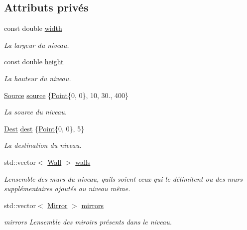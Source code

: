 \subsection*{Attributs privés}
\begin{DoxyCompactItemize}
\item 
const double \hyperlink{classLevel_ae8e8f0fd1ed923ab9faf37bebb961cdf}{width}
\begin{DoxyCompactList}\small\item\em La largeur du niveau. \end{DoxyCompactList}\item 
const double \hyperlink{classLevel_a65034a4fcaebb97c0a640600d1681ae9}{height}
\begin{DoxyCompactList}\small\item\em La hauteur du niveau. \end{DoxyCompactList}\item 
\hyperlink{classSource}{Source} \hyperlink{classLevel_ad0687b252a6b49e840a34ca5288ead55}{source} \{\hyperlink{classPoint}{Point}\{0, 0\}, 10, 30., 400\}
\begin{DoxyCompactList}\small\item\em La source du niveau. \end{DoxyCompactList}\item 
\hyperlink{classDest}{Dest} \hyperlink{classLevel_adf6fd04f684283f895ad23a4d730b680}{dest} \{\hyperlink{classPoint}{Point}\{0, 0\}, 5\}
\begin{DoxyCompactList}\small\item\em La destination du niveau. \end{DoxyCompactList}\item 
std\+::vector$<$ \hyperlink{classWall}{Wall} $>$ \hyperlink{classLevel_a6f8ce53f3e8c3a2aadbfe1385c136d5a}{walls}
\begin{DoxyCompactList}\small\item\em L\textquotesingle{}ensemble des murs du niveau, qu\textquotesingle{}ils soient ceux qui le délimitent ou des murs supplémentaires ajoutés au niveau même. \end{DoxyCompactList}\item 
std\+::vector$<$ \hyperlink{classMirror}{Mirror} $>$ \hyperlink{classLevel_acdc507d55f78548739af4988d2af3647}{mirrors}
\begin{DoxyCompactList}\small\item\em mirrors L\textquotesingle{}ensemble des miroirs présents dans le niveau. \end{DoxyCompactList}\item 

\end{DoxyCompactItemize}
